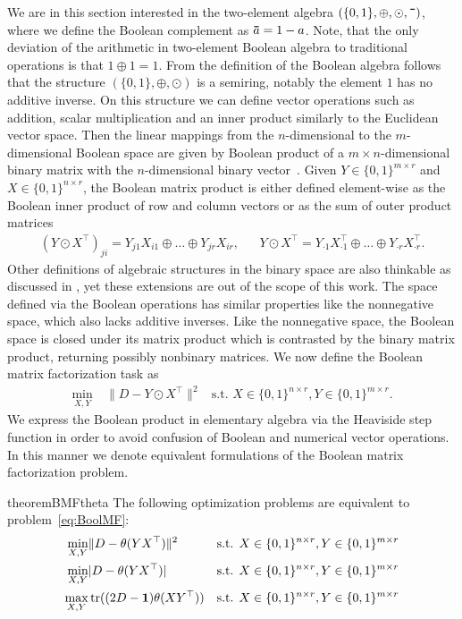 We are in this section interested in the two-element algebra $(\{0,1\},\oplus,\odot,\thickbar{\phantom{a}})$, where we define the Boolean complement as $\thickbar{a}=1-a$. Note, that the only deviation of the arithmetic in two-element Boolean algebra to traditional operations is that $1\oplus 1=1$. From the definition of the Boolean algebra follows that the structure $(\{0,1\},\oplus,\odot)$ is a semiring, notably the element $1$ has no additive inverse. On this structure we can define vector operations such as addition, scalar multiplication and an inner product similarly to the Euclidean vector space. Then the linear mappings from the $n$-dimensional to the $m$-dimensional Boolean space are given by Boolean product of  a $m\times n$-dimensional binary matrix with the $n$-dimensional binary vector~\citep{gudder2009boolean}. Given $Y\in\{0,1\}^{m\times r}$ and $X\in\{0,1\}^{n\times r}$, the Boolean matrix product is either defined element-wise as the Boolean inner product of row and column vectors or as the sum of outer product matrices
\begin{align*}
    (Y\odot X^\top)_{ji}=Y_{j1}X_{i1}\oplus \ldots \oplus Y_{jr}X_{ir},&& Y\odot X^\top = Y_{\cdot 1}X_{\cdot 1}^\top\oplus \ldots \oplus Y_{\cdot r}X_{\cdot r}^\top.
\end{align*}
Other definitions of algebraic structures in the binary space are also thinkable as discussed in \cite{miettinen2015generalized}, yet these extensions are out of the scope of this work.
The space defined via the Boolean operations has similar properties like the nonnegative space, which also lacks additive inverses. Like the nonnegative space, the Boolean space is closed under its matrix product which is contrasted by the binary matrix product, returning possibly nonbinary matrices. We now define the Boolean matrix factorization task as
\begin{align} \label{eq:BoolMF}
\min_{X,Y}\ &\|D-Y\odot X^\top\|^2 & \text{s.t. } X\in\{0,1\}^{n\times r},Y\in\{0,1\}^{m\times r}. \tag{BMF}
\end{align}
We express the Boolean product in elementary algebra via the Heaviside step function in order to avoid confusion of Boolean and numerical vector operations. In this manner we denote equivalent formulations of the Boolean matrix factorization problem.
\begin{restatable}{theorem}{BMFtheta}\label{thm:BMFtheta}
The following optimization problems are equivalent to problem~\eqref{eq:BoolMF}:
\begin{align}
    \label{eq:BoolMF_theta}
    \min_{X,Y}& \|D-\theta(YX^\top)\|^2 & \text{s.t. } X\in\{0,1\}^{n\times r},Y\in\{0,1\}^{m\times r}\\
    \label{eq:BoolMF_abs}
    \min_{X,Y}& |D-\theta(YX^\top)| & \text{s.t. } X\in\{0,1\}^{n\times r},Y\in\{0,1\}^{m\times r}\\
    \label{eq:BoolMF_thetaTr}
    \max_{X,Y}& \operatorname*{tr}( (2D-\mathbf{1})\theta(XY^\top)) & \text{s.t. } X\in\{0,1\}^{n\times r},Y\in\{0,1\}^{m\times r}
\end{align}
\end{restatable}
